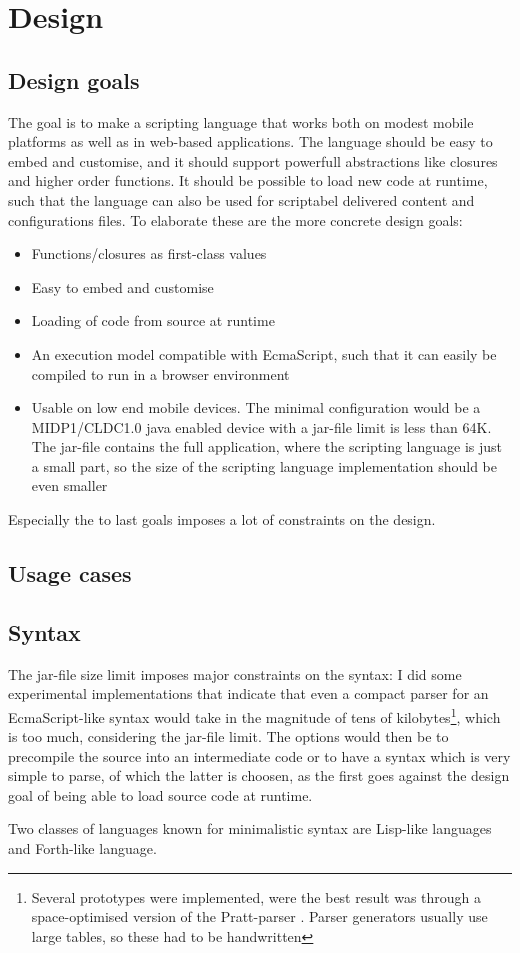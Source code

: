 \chapter{Design}
\section{Design goals}

The goal is to make a scripting language that works both on modest mobile platforms as well as in web-based applications.
The language should be easy to embed and customise, and it should support powerfull abstractions like closures and higher order functions.
It should be possible to load new code at runtime, such that the language can also be used for scriptabel delivered content and configurations files.
To elaborate these are the more concrete design goals:
\begin{itemize}
\item Functions/closures as first-class values
\item Easy to embed and customise
\item Loading of code from source at runtime
\item An execution model compatible with EcmaScript, such that it can easily be compiled to run in a browser environment
\item Usable on low end mobile devices. The minimal configuration would be a MIDP1/CLDC1.0 java enabled device with a jar-file limit is less than 64K. The jar-file contains the full application, where the scripting language is just a small part, so the size of the scripting language implementation should be even smaller
\end{itemize}
Especially the to last goals imposes a lot of constraints on the design.

\section{Usage cases}

\section{Syntax}
The jar-file size limit imposes major constraints on the syntax: I did some experimental implementations that indicate that even a compact parser for an EcmaScript-like syntax would take in the magnitude of tens of kilobytes\footnote{Several prototypes were implemented, were the best result was through a space-optimised version of the Pratt-parser \cite{pratt, beautiful-code}. Parser generators usually use large tables, so these had to be handwritten}, which is too much, considering the jar-file limit. 
The options would then be to precompile the source into an intermediate code or to have a syntax which is very simple to parse, of which the latter is choosen, as the first goes against the design goal of being able to load source code at runtime. 

Two classes of languages known for minimalistic syntax are Lisp-like languages and Forth-like language. 
